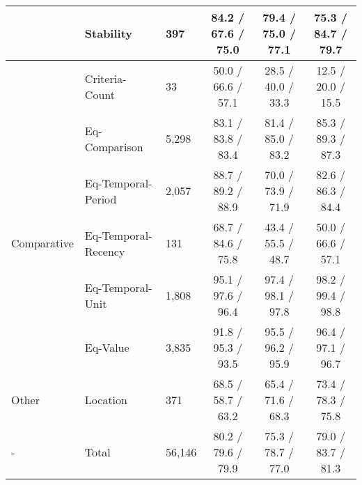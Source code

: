 \begin{tabular}{l l l c c c}
         & Stability & 397 & 84.2 / 67.6 / 75.0 & 79.4 / 75.0 / 77.1 & 75.3 / 84.7 / 79.7 \\
    \hline
      &
        Criteria-Count & 33 & 50.0 / 66.6 / 57.1 & 28.5 / 40.0 / 33.3 & 12.5 / 20.0 / 15.5 \\
     & Eq-Comparison & 5,298 & 83.1 / 83.8 / 83.4 & 81.4 / 85.0 / 83.2 & 85.3 / 89.3 / 87.3 \\
     & Eq-Temporal-Period & 2,057 & 88.7 / 89.2 / 88.9 & 70.0 / 73.9 / 71.9 & 82.6 / 86.3 / 84.4 \\
     Comparative & Eq-Temporal-Recency & 131 & 68.7 / 84.6 / 75.8 & 43.4 / 55.5 / 48.7 & 50.0 / 66.6 / 57.1 \\
     & Eq-Temporal-Unit & 1,808 & 95.1 / 97.6 / 96.4 & 97.4 / 98.1 / 97.8 & 98.2 / 99.4 / 98.8 \\
     & Eq-Value & 3,835 & 91.8 / 95.3 / 93.5 & 95.5 / 96.2 / 95.9 & 96.4 / 97.1 / 96.7  \\
    \hline   
    Other &
        Location & 371 & 68.5 / 58.7 / 63.2 & 65.4 / 71.6 / 68.3 & 73.4 / 78.3 / 75.8 \\
    \hline
    - & Total & 56,146 & 80.2 / 79.6 / 79.9 & 75.3 / 78.7 / 77.0 & 79.0 / 83.7 / 81.3 \\
    
\end{tabular}